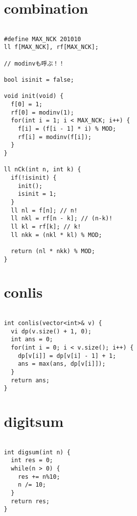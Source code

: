 \documentclass[a4j,titlepage]{jarticle} %
\begin{document}
\section{combination}
\color{black}
\begin{lstlisting}[caption=combination]

#define MAX_NCK 201010
ll f[MAX_NCK], rf[MAX_NCK];

// modinvも呼ぶ！！

bool isinit = false;

void init(void) {
  f[0] = 1;
  rf[0] = modinv(1);
  for(int i = 1; i < MAX_NCK; i++) {
    f[i] = (f[i - 1] * i) % MOD;
    rf[i] = modinv(f[i]);
  }
}

ll nCk(int n, int k) {
  if(!isinit) {
    init();
    isinit = 1;
  }
  ll nl = f[n]; // n!
  ll nkl = rf[n - k]; // (n-k)!
  ll kl = rf[k]; // k!
  ll nkk = (nkl * kl) % MOD;

  return (nl * nkk) % MOD;
}

\end{lstlisting}

\color{white}
\section{conlis}
\color{black}
\begin{lstlisting}[caption=conlis]

int conlis(vector<int>& v) {
  vi dp(v.size() + 1, 0);
  int ans = 0;
  for(int i = 0; i < v.size(); i++) {
    dp[v[i]] = dp[v[i] - 1] + 1;
    ans = max(ans, dp[v[i]]);
  }
  return ans;
}

\end{lstlisting}

\color{white}
\section{digitsum}
\color{black}
\begin{lstlisting}[caption=digitsum]

int digsum(int n) {
  int res = 0;
  while(n > 0) {
    res += n%10;
    n /= 10;
  }
  return res;
}

\end{lstlisting}

\color{white}
\end{document}
